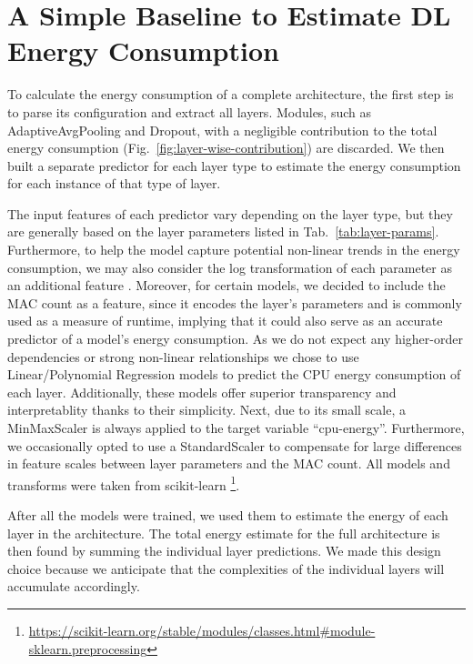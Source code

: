\section{A Simple Baseline to Estimate DL Energy Consumption}
\label{sec:simple-baseline}

To calculate the energy consumption of a complete architecture, the first step is to parse its configuration and extract all layers. Modules, such as AdaptiveAvgPooling and Dropout, with a negligible contribution to the total energy consumption (Fig.~\ref{fig:layer-wise-contribution}) are discarded. We then built a separate predictor for each layer type to estimate the energy consumption for each instance of that type of layer.

The input features of each predictor vary depending on the layer type, but they are generally based on the layer parameters listed in Tab.~\ref{tab:layer-params}. Furthermore, to help the model capture potential non-linear trends in the energy consumption, we may also consider the log transformation of each parameter as an additional feature \citep{NeuralPower_DBLP:journals/corr/abs-1710-05420}. Moreover, for certain models, we decided to include the MAC count as a feature, since it encodes the layer's parameters and is commonly used as a measure of runtime, implying that it could also serve as an accurate predictor of a model's energy consumption. As we do not expect any higher-order dependencies or strong non-linear relationships we chose to use Linear/Polynomial Regression models to predict the CPU energy consumption of each layer. Additionally, these models offer superior transparency and interpretablity thanks to their simplicity. Next, due to its small scale, a MinMaxScaler is always applied to the target variable ``cpu-energy''. Furthermore, we occasionally opted to use a StandardScaler to compensate for large differences in feature scales between layer parameters and the MAC count. All models and transforms were taken from scikit-learn \footnote{\url{https://scikit-learn.org/stable/modules/classes.html\#module-sklearn.preprocessing}}.

After all the models were trained, we used them to estimate the energy of each layer in the architecture. The total energy estimate for the full architecture is then found by summing the individual layer predictions. We made this design choice because we anticipate that the complexities of the individual layers will accumulate accordingly.